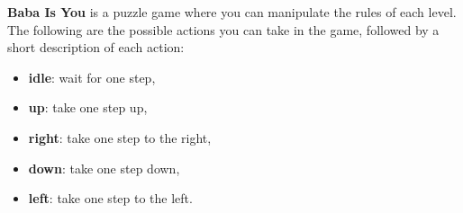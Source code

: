 \begin{GreenBox}[frametitle={\textbf{Iteration 2 Baba-is-ai Prompt}}]

\textbf{Baba Is You} is a puzzle game where you can manipulate the rules of each level. The following are the possible actions you can take in the game, followed by a short description of each action:

\begin{itemize}
    \item \textbf{idle}: wait for one step,
    \item \textbf{up}: take one step up,
    \item \textbf{right}: take one step to the right,
    \item \textbf{down}: take one step down,
    \item \textbf{left}: take one step to the left.
\end{itemize}


\end{GreenBox}
